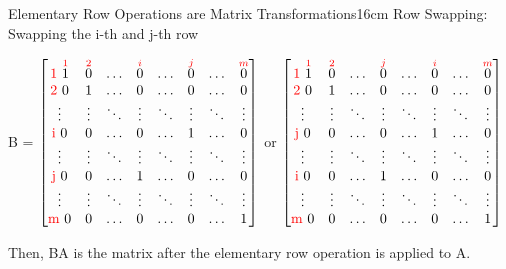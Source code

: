 \begin{definition}{Elementary Row Operations are Matrix Transformations}{16cm}
        \hspace{0.5cm}
        {\color{lgreen} Row Swapping}:
        Swapping the i-th and j-th row

        \hspace{1cm}
        B =
        $\begin{bmatrix}
            \text{\color{red} 1 } \overset{{\color{red} 1}}{1}
                & \overset{{\color{red} 2}}{0} & \hdots
                & \overset{{\color{red} i}}{0} & \hdots
                & \overset{{\color{red} j}}{0} & \hdots
                & \overset{{\color{red} m}}{0} \\
            \text{\color{red} 2 } 0 & 1 & \hdots & 0 & \hdots & 0 & \hdots & 0 \\
            \vdots & \vdots & \ddots & \vdots & \ddots & \vdots & \ddots & \vdots \\
            \text{\color{red} i } 0 & 0 & \hdots & 0 & \hdots & 1 & \hdots & 0 \\
            \vdots & \vdots & \ddots & \vdots & \ddots & \vdots & \ddots & \vdots \\
            \text{\color{red} j } 0 & 0 & \hdots & 1 & \hdots & 0 & \hdots & 0 \\
            \vdots & \vdots & \ddots & \vdots & \ddots & \vdots & \ddots & \vdots \\
            \text{\color{red} m } 0 & 0 & \hdots & 0 & \hdots & 0 & \hdots & 1
        \end{bmatrix}$
        or
        $\begin{bmatrix}
            \text{\color{red} 1 } \overset{{\color{red} 1}}{1}
                & \overset{{\color{red} 2}}{0} & \hdots
                & \overset{{\color{red} j}}{0} & \hdots
                & \overset{{\color{red} i}}{0} & \hdots
                & \overset{{\color{red} m}}{0} \\
            \text{\color{red} 2 } 0 & 1 & \hdots & 0 & \hdots & 0 & \hdots & 0 \\
            \vdots & \vdots & \ddots & \vdots & \ddots & \vdots & \ddots & \vdots \\
            \text{\color{red} j } 0 & 0 & \hdots & 0 & \hdots & 1 & \hdots & 0 \\
            \vdots & \vdots & \ddots & \vdots & \ddots & \vdots & \ddots & \vdots \\
            \text{\color{red} i } 0 & 0 & \hdots & 1 & \hdots & 0 & \hdots & 0 \\
            \vdots & \vdots & \ddots & \vdots & \ddots & \vdots & \ddots & \vdots \\
            \text{\color{red} m } 0 & 0 & \hdots & 0 & \hdots & 0 & \hdots & 1
        \end{bmatrix}$

        Then, BA is the matrix after the elementary row operation is applied to A.
    \end{definition}

